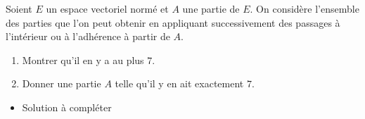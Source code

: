 \begin{enonce}
\begin{exercise}[ID={RMS134 E667},subtitle={Mines-Ponts MP
    2023},concours={mines-ponts},annee={2023},theme={analyse},filiere={MP}]
  Soient $E$ un espace vectoriel normé et $A$ une partie de $E$. On
 considère l'ensemble des parties que l'on peut obtenir en appliquant
 successivement des passages à l'intérieur ou à l'adhérence à partir
 de $A$.
 \begin{enumerate}
 \item Montrer qu'il en y a au plus $7$.
 \item Donner une partie $A$ telle qu'il y en ait exactement $7$.
 \end{enumerate}
\end{exercise}
\begin{solution}
  \begin{itemize}
    \item Solution à compléter
  \end{itemize}
\end{solution}
\end{enonce}